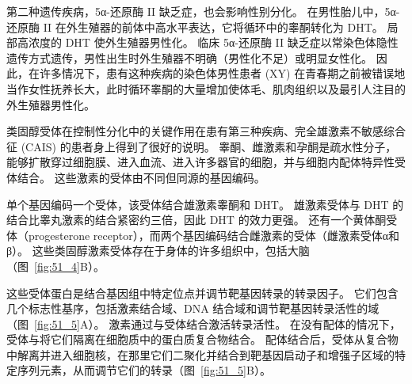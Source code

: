 第二种遗传疾病，5α-还原酶 II 缺乏症，也会影响性别分化。
在男性胎儿中，5α-还原酶 II 在外生殖器的前体中高水平表达，它将循环中的睾酮转化为 DHT。
局部高浓度的 DHT 使外生殖器男性化。
临床 5α-还原酶 II 缺乏症以常染色体隐性遗传方式遗传，男性出生时外生殖器不明确（男性化不足）或明显女性化。
因此，在许多情况下，患有这种疾病的染色体男性患者 (XY) 在青春期之前被错误地当作女性抚养长大，此时循环睾酮的大量增加使体毛、肌肉组织以及最引人注目的外生殖器男性化。


类固醇受体在控制性分化中的关键作用在患有第三种疾病、完全雄激素不敏感综合征 (CAIS) 的患者身上得到了很好的说明。
睾酮、雌激素和孕酮是疏水性分子，能够扩散穿过细胞膜、进入血流、进入许多器官的细胞，并与细胞内配体特异性受体结合。
这些激素的受体由不同但同源的基因编码。


单个基因编码一个受体，该受体结合雄激素睾酮和 DHT。
雄激素受体与 DHT 的结合比睾丸激素的结合紧密约三倍，因此 DHT 的效力更强。
还有一个黄体酮受体（progesterone receptor），而两个基因编码结合雌激素的受体（雌激素受体α和β）。 
这些类固醇激素受体存在于身体的许多组织中，包括大脑（图~\ref{fig:51_4}B）。


这些受体蛋白是结合基因组中特定位点并调节靶基因转录的转录因子。
它们包含几个标志性基序，包括激素结合域、DNA 结合域和调节靶基因转录活性的域（图~\ref{fig:51_5}A）。
激素通过与受体结合激活转录活性。
在没有配体的情况下，受体与将它们隔离在细胞质中的蛋白质复合物结合。
配体结合后，受体从复合物中解离并进入细胞核，在那里它们二聚化并结合到靶基因启动子和增强子区域的特定序列元素，从而调节它们的转录（图~\ref{fig:51_5}B）。


